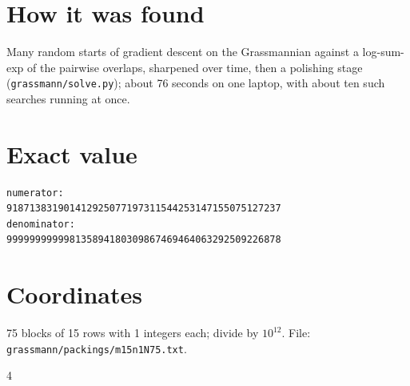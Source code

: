 \documentclass[11pt,a4paper]{article}
\begin{document}
\section{How it was found}
Many random starts of gradient descent on the Grassmannian against a log-sum-exp of the pairwise overlaps, sharpened over time, then a polishing stage (\texttt{grassmann/solve.py}); about 76 seconds on one laptop, with about ten such searches running at once.


\appendix
\section{Exact value}
{\small
\begin{verbatim}
numerator:
918713831901412925077197311544253147155075127237
denominator:
999999999998135894180309867469464063292509226878
\end{verbatim}}

\section{Coordinates}
75 blocks of 15 rows with 1 integers each; divide by $10^{12}$. File: \texttt{grassmann/packings/m15n1N75.txt}.
{\tiny
\begin{multicols}{4}
\end{multicols}}
\end{document}
